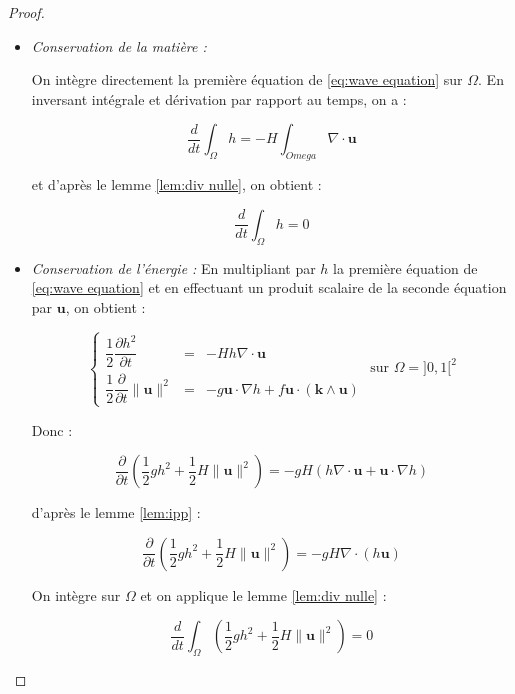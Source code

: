 \documentclass[10pt,a4paper]{article}
\def\gint{\displaystyle\int}
\begin{document}
\begin{proof}

\begin{itemize}

\item \textit{Conservation de la matière :}

On intègre directement la première équation de \eqref{eq:wave equation} sur $\Omega$. En inversant intégrale et dérivation par rapport au temps, on a :

$$
\dfrac{d}{dt} \gint_{\Omega} h = - H \gint_{Omega} \nabla \cdot \mathbf{u}
$$

et d'après le lemme \ref{lem:div nulle}, on obtient :

$$
\dfrac{d}{dt} \gint_{\Omega} h = 0
$$

\item \textit{Conservation de l'énergie :}
En multipliant par $h$ la première équation de \eqref{eq:wave equation} et en effectuant un produit scalaire de la seconde équation par $\mathbf{u}$, on obtient :

\begin{equation}
\left\lbrace
\begin{array}{rcl}
\dfrac{1}{2} \dfrac{\partial h^2}{\partial t} & = & - H h \nabla \cdot \mathbf{u} \\
\dfrac{1}{2} \dfrac{\partial}{\partial t}\| \mathbf{u} \|^2 & = & - g \mathbf{u} \cdot \nabla h + f  \mathbf{u} \cdot \left( \mathbf{k} \wedge \mathbf{u} \right)
\end{array}
\right. \text{ sur } \Omega = ]0,1[^2
\end{equation}

Donc :

$$\dfrac{\partial}{\partial t} \left( \dfrac{1}{2} g h^2 + \dfrac{1}{2} H \| \mathbf{u} \|^2 \right) = - gH \left(h \nabla \cdot \mathbf{u} +  \mathbf{u} \cdot \nabla h \right)$$

d'après le lemme \ref{lem:ipp} :

$$\dfrac{\partial}{\partial t} \left( \dfrac{1}{2} g h^2 + \dfrac{1}{2} H \| \mathbf{u} \|^2 \right) = - gH \nabla \cdot \left( h \mathbf{u} \right)$$

On intègre sur $\Omega$ et on applique le lemme \ref{lem:div nulle} :

$$
\dfrac{d}{dt} \gint_{\Omega} \left( \dfrac{1}{2} g h^2 + \dfrac{1}{2} H \| \mathbf{u} \|^2 \right)  = 0
$$

\end{itemize}
\end{proof}
\end{document}
